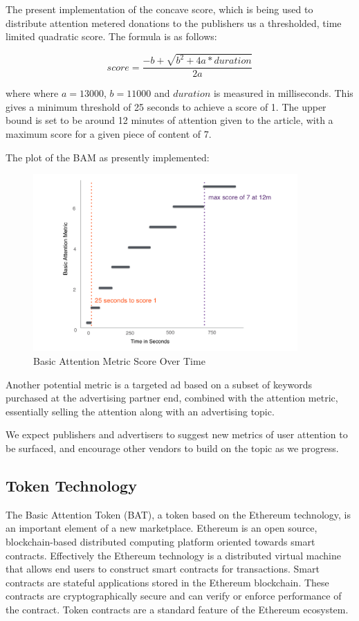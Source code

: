 \documentclass[11pt]{article}
\begin{document}
The present implementation of the concave score, which is being used to distribute attention metered donations to the publishers us a thresholded, time limited quadratic score. The formula is as follows:

\[ score= \frac{-b + \sqrt{b^2 + 4a*duration}}{2a}\]

where where $a=13000$, $b=11000 $ and $duration$ is measured in
milliseconds. This gives a minimum threshold of 25 seconds to achieve
a score of 1. The upper bound is set to be around 12 minutes of
attention given to the article, with a maximum score for a given piece
of content of 7. 

The plot of the BAM as presently implemented:


\begin{figure}
\begin{center}
\includegraphics[width=0.9\textwidth]{BAM_score_over_time.png}
\caption{Basic Attention Metric Score Over Time}
\end{center}
\end{figure}


Another potential metric is a targeted ad based on a subset of keywords purchased at the advertising partner end, combined with the attention metric, essentially selling the attention along with an advertising topic. 

We expect publishers and advertisers to suggest new metrics of user attention to be surfaced, and encourage other vendors to build on the topic as we progress.
\subsection{Token Technology}
\label{sec-4-2}

The Basic Attention Token (BAT), a token based on the Ethereum technology, is an important element of a new marketplace. Ethereum is an open source, blockchain-based distributed computing platform oriented towards smart contracts. Effectively the Ethereum technology is a distributed virtual machine that allows end users to construct smart contracts for transactions. Smart contracts are stateful applications stored in the Ethereum blockchain. These contracts are cryptographically secure and can verify or enforce performance of the contract. Token contracts are a standard feature of the Ethereum ecosystem.
\end{document}
